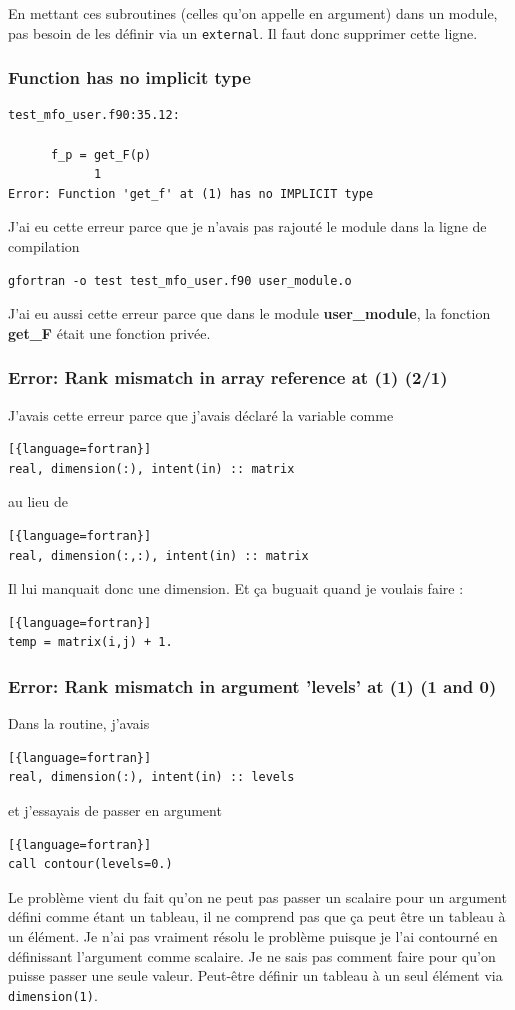 \documentclass[a4paper,twoside]{article}
\begin{document}
En mettant ces subroutines (celles qu'on appelle en argument) dans un module, pas besoin de les définir via un \texttt{external}. Il faut donc supprimer cette ligne.

\subsubsection{Function has no implicit type}
\begin{verbatim}
test_mfo_user.f90:35.12:

      f_p = get_F(p)
            1
Error: Function 'get_f' at (1) has no IMPLICIT type
\end{verbatim}

J'ai eu cette erreur parce que je n'avais pas rajouté le module dans la ligne de compilation 
\begin{verbatim}
gfortran -o test test_mfo_user.f90 user_module.o
\end{verbatim}

\bigskip

J'ai eu aussi cette erreur parce que dans le module \textbf{user\_module}, la fonction \textbf{get\_F} était une fonction privée.

\subsubsection{Error: Rank mismatch in array reference at (1) (2/1)}
J'avais cette erreur parce que j'avais déclaré la variable comme 
\begin{lstlisting}[{language=fortran}]
real, dimension(:), intent(in) :: matrix
\end{lstlisting}
au lieu de
\begin{lstlisting}[{language=fortran}]
real, dimension(:,:), intent(in) :: matrix
\end{lstlisting}
Il lui manquait donc une dimension. Et ça buguait quand je voulais faire :
\begin{lstlisting}[{language=fortran}]
temp = matrix(i,j) + 1.
\end{lstlisting}

\subsubsection{Error: Rank mismatch in argument 'levels' at (1) (1 and 0)}
Dans la routine, j'avais
\begin{lstlisting}[{language=fortran}]
real, dimension(:), intent(in) :: levels
\end{lstlisting}
et j'essayais de passer en argument
\begin{lstlisting}[{language=fortran}]
call contour(levels=0.)
\end{lstlisting}
Le problème vient du fait qu'on ne peut pas passer un scalaire pour un argument défini comme étant un tableau, il ne comprend pas que ça peut être un tableau à un élément. Je n'ai pas vraiment résolu le problème puisque je l'ai contourné en définissant l'argument comme scalaire. Je ne sais pas comment faire pour qu'on puisse passer une seule valeur. Peut-être définir un tableau à un seul élément via \texttt{dimension(1)}.
\end{document}
